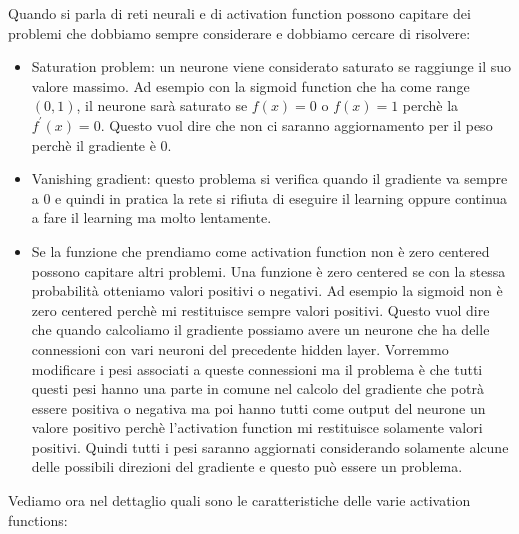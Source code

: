 \documentclass[14pt]{extreport}
\begin{document}
Quando si parla di reti neurali e di activation function possono capitare dei problemi che dobbiamo sempre considerare e dobbiamo 
cercare di risolvere:
\begin{itemize}
\item Saturation problem: un neurone viene considerato saturato se raggiunge il suo valore massimo. Ad esempio con la sigmoid function
che ha come range $(0,1)$, il neurone sarà saturato se $f(x)=0$ o $f(x)=1$ perchè la $f^{'}(x)=0$.
Questo vuol dire che non ci saranno aggiornamento per il peso perchè il gradiente è 0.
\item Vanishing gradient: questo problema si verifica quando il gradiente va sempre a 0 e quindi in pratica la rete si rifiuta di 
eseguire il learning oppure continua a fare il learning ma molto lentamente.
\item Se la funzione che prendiamo come activation function non è zero centered possono capitare altri problemi. Una funzione è zero
centered se con la stessa probabilità otteniamo valori positivi o negativi. Ad esempio la sigmoid non è zero centered perchè mi restituisce
sempre valori positivi. Questo vuol dire che quando calcoliamo il gradiente possiamo avere un neurone che ha delle connessioni con vari 
neuroni del precedente hidden layer. Vorremmo modificare i pesi associati a queste connessioni ma il problema è che tutti questi pesi 
hanno una parte in comune nel calcolo del gradiente che potrà essere positiva o negativa ma poi hanno tutti come output del neurone un valore
positivo perchè l'activation function mi restituisce solamente valori positivi. Quindi tutti i pesi saranno aggiornati considerando solamente 
alcune delle possibili direzioni del gradiente e questo può essere un problema.
\end{itemize}

Vediamo ora nel dettaglio quali sono le caratteristiche delle varie activation functions:
\end{document}
